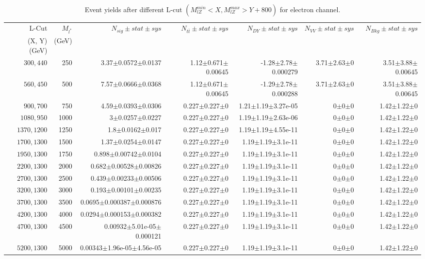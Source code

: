 \documentclass[]{article}
\begin{document}
\begin{table}
\begin{center}
\scriptsize{
\begin{tabular}{ |r|r|r|r|r|r|r|}
\hline 
L-Cut & $M_{l^*}$ & $N_{sig}\pm stat \pm sys $ &$N_{t\bar{t}}\pm stat \pm sys $ & $N_{DY}\pm stat \pm sys $ & $N_{VV}\pm stat \pm sys $ &$N_{Bkg}\pm stat \pm sys$\\
 (X, Y) (GeV) & (GeV) & && &&\\
\hline 
$300, 440$ & 250 & 3.37$\pm$0.0572$\pm$0.0137 & 1.12$\pm$0.671$\pm$0.00645 & -1.28$\pm$2.78$\pm$0.000279 & 3.71$\pm$2.63$\pm$0 & 3.51$\pm$3.88$\pm$0.00645 \\
$560, 450$ & 500 & 7.57$\pm$0.0666$\pm$0.0368 & 1.12$\pm$0.671$\pm$0.00645 & -1.29$\pm$2.78$\pm$0.000288 & 3.71$\pm$2.63$\pm$0 & 3.51$\pm$3.88$\pm$0.00645 \\
$900, 700$ & 750 & 4.59$\pm$0.0393$\pm$0.0306 & 0.227$\pm$0.227$\pm$0 & 1.21$\pm$1.19$\pm$3.27e-05 & 0$\pm$0$\pm$0 & 1.42$\pm$1.22$\pm$0 \\
$1080,950$ & 1000 & 3$\pm$0.0257$\pm$0.0227 & 0.227$\pm$0.227$\pm$0 & 1.19$\pm$1.19$\pm$2.63e-06 & 0$\pm$0$\pm$0 & 1.42$\pm$1.22$\pm$0 \\
$1370,1200$ & 1250 & 1.8$\pm$0.0162$\pm$0.017 & 0.227$\pm$0.227$\pm$0 & 1.19$\pm$1.19$\pm$4.55e-11 & 0$\pm$0$\pm$0 & 1.42$\pm$1.22$\pm$0 \\
$1700,1300$ & 1500 & 1.37$\pm$0.0254$\pm$0.0147 & 0.227$\pm$0.227$\pm$0 & 1.19$\pm$1.19$\pm$3.1e-11 & 0$\pm$0$\pm$0 & 1.42$\pm$1.22$\pm$0 \\
$1950,1300$ & 1750 & 0.898$\pm$0.00742$\pm$0.0104 & 0.227$\pm$0.227$\pm$0 & 1.19$\pm$1.19$\pm$3.1e-11 & 0$\pm$0$\pm$0 & 1.42$\pm$1.22$\pm$0 \\
$2200,1300$ & 2000 & 0.682$\pm$0.00528$\pm$0.00826 & 0.227$\pm$0.227$\pm$0 & 1.19$\pm$1.19$\pm$3.1e-11 & 0$\pm$0$\pm$0 & 1.42$\pm$1.22$\pm$0 \\
$2700,1300$ & 2500 & 0.439$\pm$0.00233$\pm$0.00506 & 0.227$\pm$0.227$\pm$0 & 1.19$\pm$1.19$\pm$3.1e-11 & 0$\pm$0$\pm$0 & 1.42$\pm$1.22$\pm$0 \\
$3200,1300$ & 3000 & 0.193$\pm$0.00101$\pm$0.00235 & 0.227$\pm$0.227$\pm$0 & 1.19$\pm$1.19$\pm$3.1e-11 & 0$\pm$0$\pm$0 & 1.42$\pm$1.22$\pm$0 \\
$3700,1300$ & 3500 & 0.0695$\pm$0.000387$\pm$0.000876 & 0.227$\pm$0.227$\pm$0 & 1.19$\pm$1.19$\pm$3.1e-11 & 0$\pm$0$\pm$0 & 1.42$\pm$1.22$\pm$0 \\
$4200,1300$ & 4000 & 0.0294$\pm$0.000153$\pm$0.000382 & 0.227$\pm$0.227$\pm$0 & 1.19$\pm$1.19$\pm$3.1e-11 & 0$\pm$0$\pm$0 & 1.42$\pm$1.22$\pm$0 \\
$4700,1300$ & 4500 & 0.00932$\pm$5.01e-05$\pm$0.000121 & 0.227$\pm$0.227$\pm$0 & 1.19$\pm$1.19$\pm$3.1e-11 & 0$\pm$0$\pm$0 & 1.42$\pm$1.22$\pm$0 \\
$5200,1300$ & 5000 & 0.00343$\pm$1.96e-05$\pm$4.56e-05 & 0.227$\pm$0.227$\pm$0 & 1.19$\pm$1.19$\pm$3.1e-11 & 0$\pm$0$\pm$0 & 1.42$\pm$1.22$\pm$0 \\
\hline 
\end{tabular}
}
\end{center}
\caption{Event yields after different L-cut $(M_{lZ}^{min} < X, M_{lZ}^{max} > Y + 800)$ for electron channel.}
\end{table}
\end{document}
